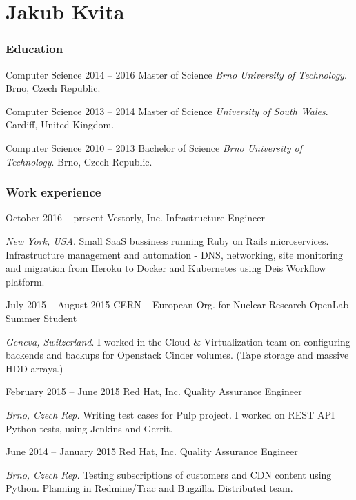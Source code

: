 \documentclass{tccv}
\begin{document}
\part{Jakub Kvita}

\section{Education}

\begin{yearlist}
	
	\item[Computer Science]{2014 -- 2016}
	{Master of Science}
	{\emph{Brno University of Technology}. Brno, Czech Republic.}
	
	\item[Computer Science]{2013 -- 2014}
	{Master of Science}
	{\emph{University of South Wales}. Cardiff, United Kingdom.}
	
	\item[Computer Science]{2010 -- 2013}
	{Bachelor of Science}
	{\emph{Brno University of Technology}. Brno, Czech Republic.}
	
\end{yearlist}

\section{Work experience}

\begin{eventlist}

\item{October 2016 -- present}
{Vestorly, Inc.}
{Infrastructure Engineer}

\emph{New York, USA}. Small SaaS bussiness running Ruby on Rails microservices. Infrastructure management and automation - DNS, networking, site monitoring and migration from Heroku to Docker and Kubernetes using Deis Workflow platform.

\item{July 2015 -- August 2015}
     {CERN -- European Org. for Nuclear Research}
     {OpenLab Summer Student}

\emph{Geneva, Switzerland}. I worked in the Cloud \& Virtualization team on configuring backends and backups for Openstack Cinder volumes. (Tape storage and massive HDD arrays.)

\item{February 2015 -- June 2015}
     {Red Hat, Inc.}
     {Quality Assurance Engineer}

\emph{Brno, Czech Rep.} Writing test cases for Pulp project. I worked on REST API Python tests, using Jenkins and Gerrit.

\item{June 2014 -- January 2015}
     {Red Hat, Inc.}
     {Quality Assurance Engineer}

\emph{Brno, Czech Rep.} Testing subscriptions of customers and CDN content using Python. Planning in Redmine/Trac and Bugzilla. Distributed team.

\end{eventlist}
\end{document}
